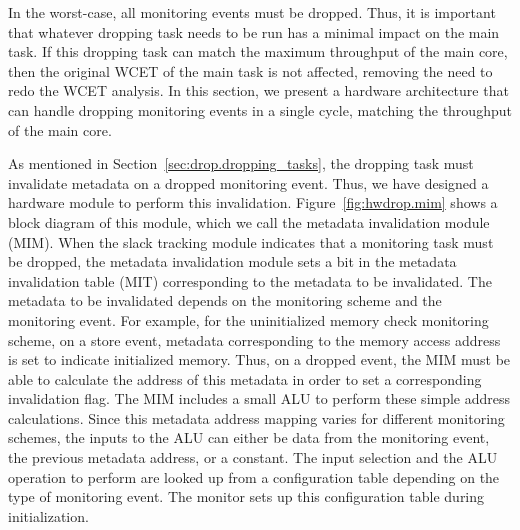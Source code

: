 In the worst-case, all monitoring events must be dropped. Thus, it is important
that whatever dropping task needs to be run has a minimal impact on the main
task. If this dropping task can match the maximum throughput of the main core,
then the original WCET of the main task is not affected, removing the need to
redo the WCET analysis. In this section, we present a hardware architecture
that can handle dropping monitoring events in a single cycle, matching the
throughput of the main core.

As mentioned in Section~\ref{sec:drop.dropping_tasks}, the dropping task must
invalidate metadata on a dropped monitoring event.  Thus, we have designed a
hardware module to perform this invalidation. Figure~\ref{fig:hwdrop.mim} shows
a block diagram of this module, which we call the metadata invalidation module
(MIM).  When the slack tracking module indicates that a monitoring task must be
dropped, the metadata invalidation module sets a bit in the metadata
invalidation table (MIT) corresponding to the metadata to be invalidated.  The
metadata to be invalidated depends on the monitoring scheme and the monitoring
event. For example, for the uninitialized memory check monitoring scheme, on a
store event, metadata corresponding to the memory access address is set to
indicate initialized memory. Thus, on a dropped event, the MIM must be able to
calculate the address of this metadata in order to set a corresponding
invalidation flag.  The MIM includes a small ALU to perform these simple
address calculations. Since this metadata address mapping varies for different
monitoring schemes, the inputs to the ALU can either be data from the
monitoring event, the previous metadata address, or a constant. The input
selection and the ALU operation to perform are looked up from a configuration
table depending on the type of monitoring event.  The monitor sets up this
configuration table during initialization.

